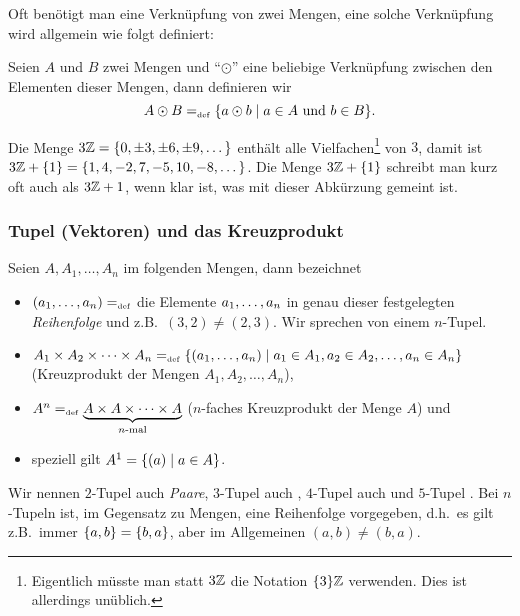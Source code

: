 \goodbreak

Oft benötigt man eine Verknüpfung von zwei Mengen, eine solche
Verknüpfung wird allgemein wie folgt definiert:

\begin{definition}
Seien $A$ und $B$ zwei Mengen und "`$\odot$"' eine beliebige
Verknüpfung zwischen den Elementen dieser Mengen, dann definieren wir
\begin{displaymath}
A \odot B =_{\mathrm{\scriptscriptstyle def}} \{a \odot b \mid a \in A \text{ und } b \in B\}.
\end{displaymath}
\end{definition}

\begin{example}
Die Menge $3\mathbb Z = \{0, \pm 3, \pm 6, \pm 9, \dots\}$ enthält alle
Vielfachen\footnote{Eigentlich müsste man statt $3\mathbb Z$ die Notation
$\{3\}\mathbb Z$ verwenden. Dies ist allerdings unüblich.} von $3$, damit
ist $3\mathbb Z + \{1\} = \{1,\allowbreak 4,\allowbreak -2,\allowbreak
7,\allowbreak -5, 10, -8, \dots\}$. Die Menge $3\mathbb Z + \{1\}$ schreibt
man kurz oft auch als $3\mathbb Z + 1$, wenn klar ist, was mit dieser
Abkürzung gemeint ist.
\end{example}

\subsubsection{Tupel (Vektoren) und das Kreuzprodukt}
Seien $A, A_1, \dots , A_n$ im folgenden Mengen, dann bezeichnet

\begin{itemize}
  \item $({a_{1}}, \allowbreak \dots , \allowbreak{a_{n}}) =_{\mathrm{\scriptscriptstyle def}}$ die Elemente ${a_{1}}, \allowbreak \dots , \allowbreak{a_{n}}$ in genau dieser
  festgelegten \emph{Reihenfolge} und z.B.~$(3,2) \not= (2,3)$. Wir
  sprechen von einem $n$-Tupel.
  \item $A_1 \times A_2 \times \dots \times
  A_n =_{\mathrm{\scriptscriptstyle def}} \{({a_{1}}, \allowbreak \dots , \allowbreak{a_{n}}) \mid a_1 \in A_1, a_2 \in A_2, \dots
  ,a_n \in A_n \}$ (Kreuzprodukt der Mengen $A_1, A_2, \dots ,
  A_n$)\index{$\times$},
  \item $A^n =_{\mathrm{\scriptscriptstyle def}} \underbrace{A \times A \times \dots \times
  A}_{n\text{-mal}}$ ($n$-faches Kreuzprodukt der Menge $A$) und
  \item speziell gilt $A^1 = \{(a) \mid a \in A\}$.
\end{itemize}
Wir nennen $2$-Tupel auch \emph{Paare}, $3$-Tupel
auch , $4$-Tupel auch  und $5$-Tupel 
. Bei $n$-Tupeln ist, im Gegensatz zu Mengen, eine 
Reihenfolge vorgegeben, d.h.~es gilt z.B.~immer $\{a,b\} = \{b,a\}$, aber 
im Allgemeinen $(a,b) \not= (b,a)$.

